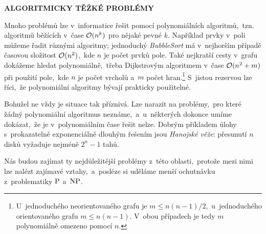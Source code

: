 \documentclass[11pt,a4paper,oneside]{article}
\begin{document}
\begin{center}
    {\huge \textbf{\MakeUppercase{Algoritmicky těžké problémy}}}\\[1.2cm]
\end{center}

Mnoho problémů lze v~informatice řešit pomocí polynomiálních algoritmů,~tzn. algoritmů běžících v~čase $\mathcal{O}(n^k)$ pro nějaké pevné $k$. Například prvky v~poli můžeme řadit různými algoritmy; jednoduchý \emph{BubbleSort} má v~nejhorším případě časovou složitost $\mathcal{O}(n^2)$,~kde $n$ je počet prvků pole. Také nejkratší cesty v~grafu dokážeme hledat polynomiálně,~třeba Dijkstrovým algoritmem v~čase $\mathcal{O}(n^2+m)$ při použití pole,~kde $n$ je počet vrcholů a~$m$ počet hran.\footnote{U~jednoduchého neorientovaného grafu je $m\leqslant n(n-1)/2$,~u~jednoduchého orientovaného grafu $m\leqslant n(n-1)$. V~obou případech je tedy $m$ polynomiálně omezeno pomocí $n$.} S~jistou rezervou lze říci,~že polynomiální algoritmy bývají prakticky použitelné.

Bohužel ne vždy je situace tak příznivá. Lze narazit na problémy,~pro které žádný polynomiální algoritmus neznáme,~a~u~některých dokonce umíme dokázat,~že je v~polynomiálním čase řešit nelze. Dobrým příkladem úlohy s~prokazatelně exponenciálně dlouhým řešením jsou \emph{Hanojské věže}: přesunutí $n$ disků vyžaduje nejméně $2^n-1$ tahů.

Nás budou zajímat ty nejdůležitější problémy z~této oblasti,~protože mezi nimi lze nalézt zajímavé vztahy,~a~posléze si uděláme menší ochutnávku z~problematiky \ensuremath{\classP} a~\ensuremath{\classNP}.







\end{document}
